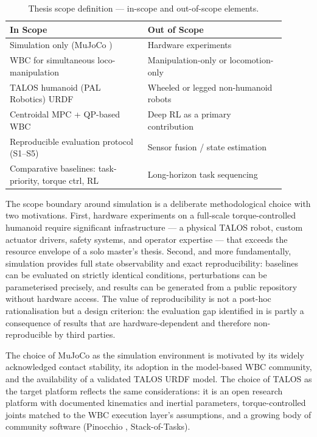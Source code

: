 \begin{table}[h]
  \centering
  \caption{Thesis scope definition — in-scope and out-of-scope elements.}
  \label{tab:scope}
  \begin{tabular}{p{0.45\linewidth} p{0.45\linewidth}}
    \toprule
    \textbf{In Scope} & \textbf{Out of Scope} \\
    \midrule
    Simulation only (MuJoCo \cite{MuJoCo2012})
      & Hardware experiments \\
    WBC for simultaneous loco-manipulation
      & Manipulation-only or locomotion-only \\
    TALOS humanoid (PAL Robotics) URDF
      & Wheeled or legged non-humanoid robots \\
    Centroidal MPC + QP-based WBC
      & Deep RL as a primary contribution \\
    Reproducible evaluation protocol (S1--S5)
      & Sensor fusion / state estimation \\
    Comparative baselines: task-priority, torque ctrl, RL
      & Long-horizon task sequencing \\
    \bottomrule
  \end{tabular}
\end{table}

The scope boundary around simulation is a deliberate methodological
choice with two motivations. First, hardware experiments on a
full-scale torque-controlled humanoid require significant
infrastructure — a physical TALOS robot, custom actuator drivers,
safety systems, and operator expertise — that exceeds the resource
envelope of a solo master's thesis. Second, and more fundamentally,
simulation provides full state observability and exact reproducibility:
baselines can be evaluated on strictly identical conditions,
perturbations can be parameterised precisely, and results can be
generated from a public repository without hardware access. The value
of reproducibility is not a post-hoc rationalisation but a design
criterion: the evaluation gap identified in  is
partly a consequence of results that are hardware-dependent and
therefore non-reproducible by third parties.

The choice of MuJoCo \cite{MuJoCo2012} as the simulation environment is
motivated by its widely acknowledged contact stability, its adoption in
the model-based WBC community, and the availability of a validated
TALOS URDF model. The choice of TALOS as the target platform reflects
the same considerations: it is an open research platform with
documented kinematics and inertial parameters, torque-controlled joints
matched to the WBC execution layer's assumptions, and a growing body of
community software (Pinocchio \cite{Pinocchio}, Stack-of-Tasks).

